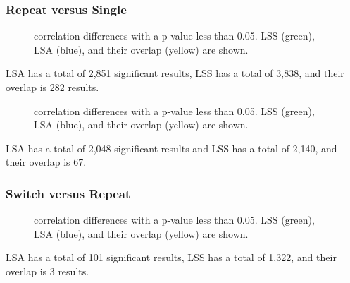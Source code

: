 \documentclass[10pt,letterpaper]{article}
\begin{document}
\subsubsection*{Repeat versus Single}
\begin{figure}[H]
  \centering
  
  \caption{
    correlation differences with a p-value less than 0.05.
    LSS (green), LSA (blue), and their overlap (yellow) are shown.
  }
  \label{fig:repeatvsingle}
\end{figure}
LSA has a total of 2,851 significant results, LSS has a total of 3,838,
and their overlap is 282 results.

\begin{figure}[H]
  \centering
  
  \caption{
    correlation differences with a p-value less than 0.05.
    LSS (green), LSA (blue), and their overlap (yellow) are shown.
  }
  \label{fig:restrepeatvsingle}
\end{figure}
LSA has a total of 2,048 significant results and LSS has a total of 2,140,
and their overlap is 67.

\subsubsection*{Switch versus Repeat}
\begin{figure}[H]
  \centering
  
  \caption{
    correlation differences with a p-value less than 0.05.
    LSS (green), LSA (blue), and their overlap (yellow) are shown.
  }
  \label{fig:switchvrepeat}
\end{figure}
LSA has a total of 101 significant results, LSS has a total of 1,322,
and their overlap is 3 results.
\end{document}
